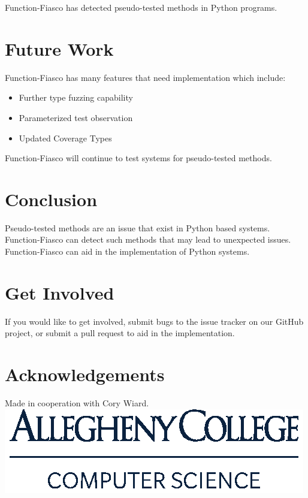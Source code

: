 \documentclass[a0paper,fleqn]{betterposter}
\begin{document}
{Function-Fiasco has detected pseudo-tested methods in Python programs.

\section{Future Work}
Function-Fiasco has many features that need implementation which include:\\
\begin{itemize}[leftmargin=*]
\item{Further type fuzzing capability}
\item{Parameterized test observation}
\item{Updated Coverage Types}
\end{itemize}
\vspace{1em}
Function-Fiasco will continue to test systems for pseudo-tested methods.

\section{Conclusion}
Pseudo-tested methods are an issue that exist in Python based systems. Function-Fiasco can detect such methods that may lead to unexpected issues. Function-Fiasco can aid in the implementation of Python systems.


\section{Get Involved}

If you would like to get involved, submit bugs to the issue tracker on our
GitHub project, or submit a pull request to aid in the implementation. \vfill


\section{Acknowledgements}
Made in cooperation with Cory Wiard.\\

\includegraphics[width=\textwidth]{img/ComputerScience-Stack}
}
\end{document}
